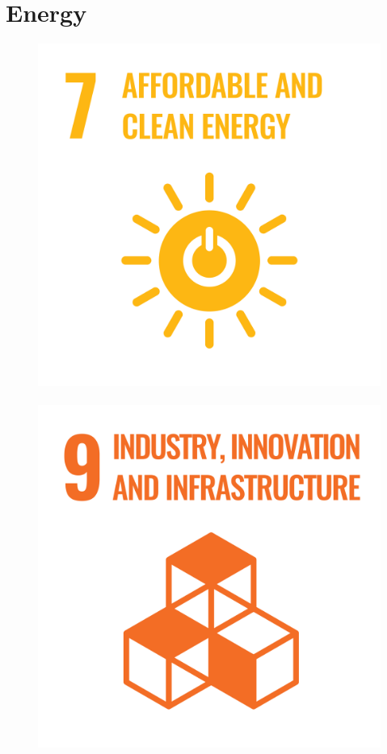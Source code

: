 \documentclass[../SustainableHEP.tex]{subfiles}
\begin{document}
\RaggedRight
\sloppy

\newpage
\section{Energy}
\label{sec:Energy}
\exSum


\begin{figure}
\includegraphics[width=\SDGsize]{Sections/Figs/Common/SDG_7_CleanEnergy.png}~%
\includegraphics[width=\SDGsize]{Sections/Figs/Common/SDG_9_IndustryInnovation.png}~%

\end{figure}
\end{document}
